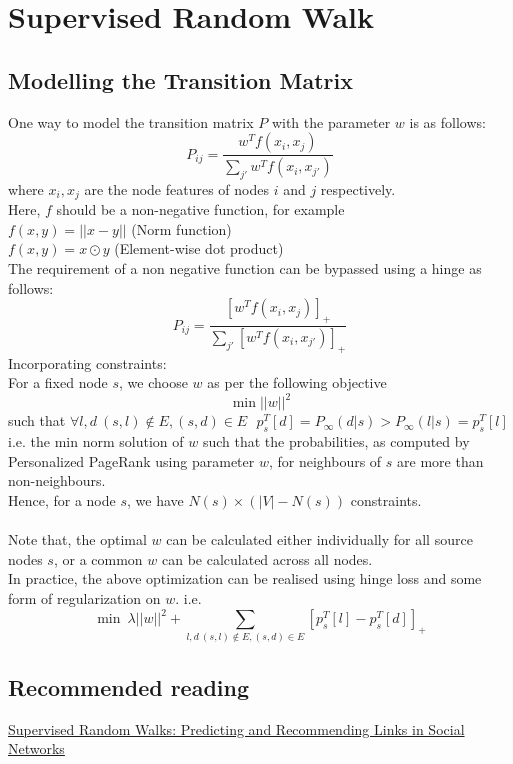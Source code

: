 \documentclass{article}
\begin{document}
\section{Supervised Random Walk}
\subsection{Modelling the Transition Matrix}
One way to model the transition matrix $P$ with the parameter $w$ is as follows:
\begin{equation*}
    P_{ij} = \frac{w^Tf(x_i, x_j)}{\sum_{j'}{w^Tf(x_i, x_{j'})}}
\end{equation*}
where $x_i, x_j$ are the node features of nodes $i$ and $j$ respectively.\\
Here, $f$ should be a non-negative function, for example\\
$f(x, y) = ||x-y||$ (Norm function)\\
$f(x, y) = x \odot y$ (Element-wise dot product)\\
The requirement of a non negative function can be bypassed using a hinge as follows:
\begin{equation*}
    P_{ij} = \frac{[w^Tf(x_i, x_j)]_+}{\sum_{j'}{[w^Tf(x_i, x_{j'})]_+}}
\end{equation*}
Incorporating constraints:\\
For a fixed node $s$, we choose $w$ as per the following objective
$$\min ||w||^2 $$ such that $\forall l, d\ (s, l) \notin E, (s, d) \in E\ \ \  p^T_s[d] = P_\infty (d|s) > P_\infty (l|s) = p^T_s[l]$
\\
i.e. the min norm solution of $w$ such that the probabilities, as computed by Personalized PageRank using parameter $w$, for neighbours of $s$ are more than  non-neighbours.\\
Hence, for a node $s$, we have $N(s) \times (|V| - N(s))$ constraints.\\
\\
Note that, the optimal $w$ can be calculated either individually for all source nodes $s$, or a common $w$ can be calculated across all nodes. \\
In practice, the above optimization can be realised using hinge loss and some form of regularization on $w$.
i.e. 
$$\min\  \lambda ||w||^2 + \sum_{l, d\ (s, l) \notin E, (s, d) \in E}{[p^T_s[l]-p^T_s[d]]_+}$$
\subsection{Recommended reading}
\href{https://cs.stanford.edu/~jure/pubs/linkpred-wsdm11.pdf}{Supervised Random Walks: Predicting and Recommending Links in Social Networks}\cite{wsdm}


\end{document}
